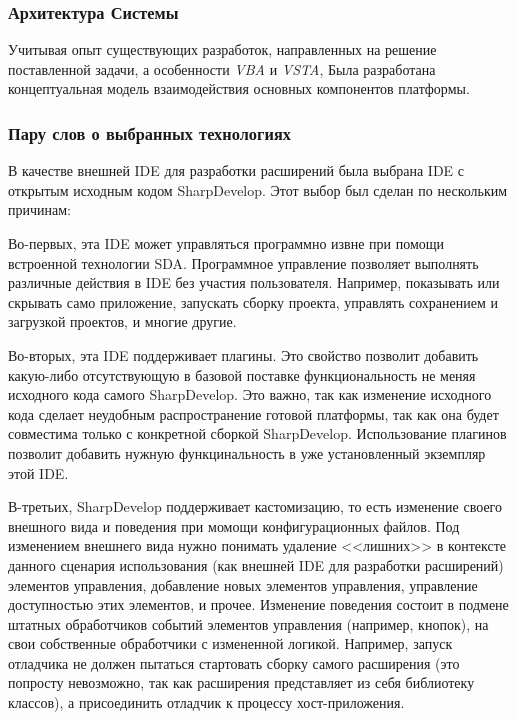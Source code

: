 \subsubsection{Архитектура Системы}

Учитывая опыт существующих разработок, направленных на решение поставленной задачи, а особенности {\it VBA} и {\it VSTA}, Была разработана концептуальная модель взаимодействия основных компонентов платформы.

\subsubsection{Пару слов о выбранных технологиях}

В качестве внешней IDE для разработки расширений была выбрана IDE с открытым исходным кодом SharpDevelop. Этот выбор был сделан по нескольким причинам:

Во-первых, эта IDE может управляться программно извне при помощи встроенной технологии SDA. Программное управление позволяет выполнять различные действия в IDE без участия пользователя. Например, показывать или скрывать само приложение, запускать сборку проекта, управлять сохранением и загрузкой проектов, и многие другие. 

Во-вторых, эта IDE поддерживает плагины. Это свойство позволит добавить какую-либо отсутствующую в базовой поставке функциональность не меняя исходного кода самого SharpDevelop. Это важно, так как изменение исходного кода сделает неудобным распространение готовой платформы, так как она будет совместима только с конкретной сборкой SharpDevelop. Использование плагинов позволит добавить нужную функцинальность в уже установленный экземпляр этой IDE.

В-третьих, SharpDevelop поддерживает кастомизацию, то есть изменение своего внешного вида и поведения при момощи конфигурационных файлов. Под изменением внешнего вида нужно понимать удаление <<лишних>> в контексте данного сценария использования (как внешней IDE для разработки расширений) элементов управления, добавление новых элементов управления, управление доступностью этих элементов, и прочее. Изменение поведения состоит в подмене штатных обработчиков событий элементов управления (например, кнопок), на свои собственные обработчики с измененной логикой. Например, запуск отладчика не должен пытаться стартовать сборку самого расширения (это попросту невозможно, так как расширения представляет из себя библиотеку классов), а присоединить отладчик к процессу хост-приложения.


